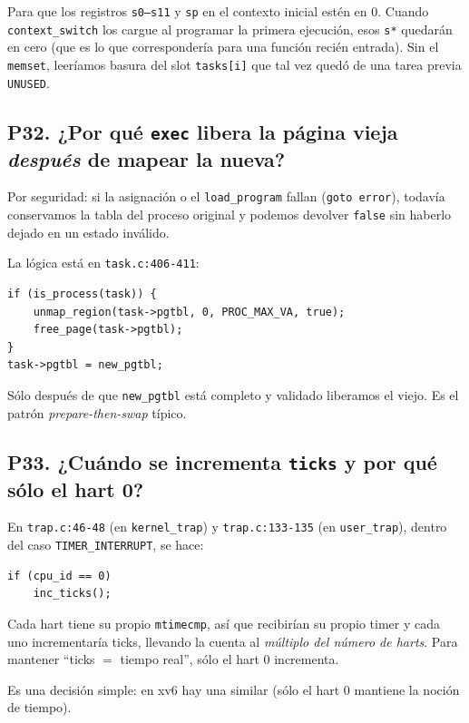 \documentclass[11pt,a4paper]{article}
\begin{document}
\begin{respuesta}
Para que los registros \texttt{s0--s11} y \texttt{sp} en el
contexto inicial estén en 0. Cuando \texttt{context\_switch} los
cargue al programar la primera ejecución, esos \texttt{s*}
quedarán en cero (que es lo que correspondería para una función
recién entrada). Sin el \texttt{memset}, leeríamos basura del slot
\texttt{tasks[i]} que tal vez quedó de una tarea previa
\texttt{UNUSED}.
\end{respuesta}

\subsection*{P32. ¿Por qué \texttt{exec} libera la página vieja \emph{después} de mapear la nueva?}

\begin{respuesta}
Por seguridad: si la asignación o el \texttt{load\_program} fallan
(\texttt{goto error}), todavía conservamos la tabla del proceso
original y podemos devolver \texttt{false} sin haberlo dejado en un
estado inválido.

La lógica está en \texttt{task.c:406-411}:

\begin{lstlisting}[style=cstyle]
if (is_process(task)) {
    unmap_region(task->pgtbl, 0, PROC_MAX_VA, true);
    free_page(task->pgtbl);
}
task->pgtbl = new_pgtbl;
\end{lstlisting}

Sólo después de que \texttt{new\_pgtbl} está completo y validado
liberamos el viejo. Es el patrón \emph{prepare-then-swap} típico.
\end{respuesta}

\subsection*{P33. ¿Cuándo se incrementa \texttt{ticks} y por qué sólo el hart 0?}

\begin{respuesta}
En \texttt{trap.c:46-48} (en \texttt{kernel\_trap}) y
\texttt{trap.c:133-135} (en \texttt{user\_trap}), dentro del caso
\texttt{TIMER\_INTERRUPT}, se hace:

\begin{lstlisting}[style=cstyle]
if (cpu_id == 0)
    inc_ticks();
\end{lstlisting}

Cada hart tiene su propio \texttt{mtimecmp}, así que recibirían su
propio timer y cada uno incrementaría ticks, llevando la cuenta al
\emph{múltiplo del número de harts}. Para mantener ``ticks $=$
tiempo real'', sólo el hart 0 incrementa.

Es una decisión simple: en xv6 hay una similar (sólo el hart 0
mantiene la noción de tiempo).
\end{respuesta}
\end{document}
